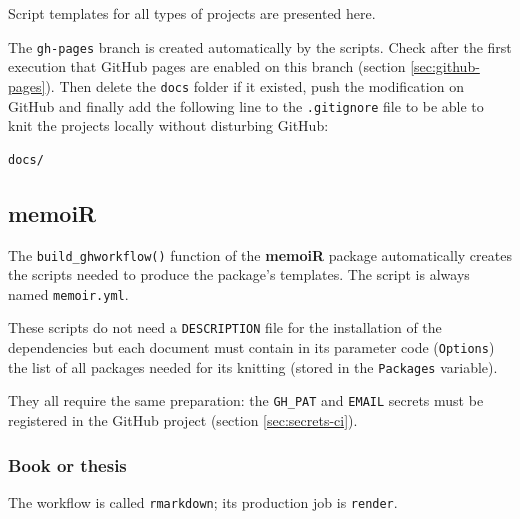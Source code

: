 \documentclass[
  12pt,
  american,
  a4paper,
  extrafontsizes,onecolumn,openright
  ]{memoir}
\begin{document}
Script templates for all types of projects are presented here.

The \texttt{gh-pages} branch is created automatically by the scripts.
Check after the first execution that GitHub pages are enabled on this branch (section \ref{sec:github-pages}).
Then delete the \texttt{docs} folder if it existed, push the modification on GitHub and finally add the following line to the \texttt{.gitignore} file to be able to knit the projects locally without disturbing GitHub:

\begin{verbatim}
docs/
\end{verbatim}

\subsection{memoiR}\label{sec:memoiR-ci}

The \texttt{build\_ghworkflow()} function of the \textbf{memoiR} package automatically creates the scripts needed to produce the package's templates.
The script is always named \texttt{memoir.yml}.

These scripts do not need a \texttt{DESCRIPTION} file for the installation of the dependencies but each document must contain in its parameter code (\texttt{Options}) the list of all packages needed for its knitting (stored in the \texttt{Packages} variable).

They all require the same preparation: the \texttt{GH\_PAT} and \texttt{EMAIL} secrets must be registered in the GitHub project (section \ref{sec:secrets-ci}).

\subsubsection{Book or thesis}\label{sec:bookdown-ci}

The workflow is called \texttt{rmarkdown}; its production job is \texttt{render}.
\end{document}
